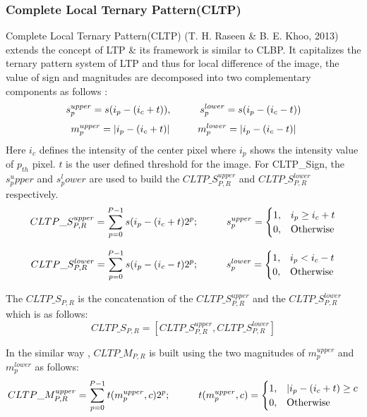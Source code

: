 \documentclass[12pt]{article}
\newcommand\tab[1][1cm]{\hspace*{#1}}
\begin{document}
\subsubsection{Complete Local Ternary Pattern(CLTP)}
Complete Local Ternary Pattern(CLTP) (T. H. Raseen \& B. E. Khoo, 2013)\cite{cltp01} extends the concept of LTP \& its framework is similar to CLBP. It capitalizes the ternary pattern system of LTP and thus for local difference of the image, the value of sign and magnitudes are decomposed into two complementary components as follows : 
$$
s_p^{upper} = s(i_p - (i_c + t)), \tab s_p^{lower} = s(i_p - (i_c - t))\\
$$
$$
m_p^{upper} = |i_p - (i_c +t)| \tab 	m_p^{lower} = |i_p - (i_c -t)|\\
$$
Here $i_c$ defines the intensity of the center pixel where $i_p$ shows the intensity value of $p_{th}$ pixel. $t$ is the user defined threshold for the image. For CLTP\_Sign, the $	s_p^upper$ and $s_p^lower$ are used to build the $CLTP\_S_{P,R}^{upper}$ and $CLTP\_S_{P,R}^{lower} $ respectively.
\begin{equation}
CLTP\_S_{P,R}^{upper} = \sum\limits_{p=0}^{P-1}{s(i_p - (i_c + t){{2}^{p}}}; \tab  	s_p^{upper}= 
\begin{cases}
1,&  i_p\geq i_c + t\\
0,&  \text{Otherwise}
\end{cases}
\end{equation}

\begin{equation}
CLTP\_S_{P,R}^{lower} = \sum\limits_{p=0}^{P-1}{s(i_p - (i_c - t){{2}^{p}}}; \tab  	s_p^{lower}= 
\begin{cases}
1,&  i_p < i_c - t\\
0,&  \text{Otherwise}
\end{cases}
\end{equation}

The $CLTP\_S_{P,R}$ is the concatenation of the $CLTP\_S_{P,R}^{upper}$ and the $CLTP\_S_{P,R}^{lower}$ which is as follows:
\begin{equation}
CLTP\_S_{P,R}= [CLTP\_S_{P,R}^{upper},CLTP\_S_{P,R}^{lower}]
\end{equation}

In the similar way , $CLTP\_M_{P,R}$ is built using the two magnitudes of $	m_p^{upper}$ and $	m_p^{lower}$ as  follows:
\begin{equation}
CLTP\_M_{P,R}^{upper} = \sum\limits_{p=0}^{P-1}{t(m_p^{upper},c){{2}^{p}}}; \tab  	t(m_p^{upper},c)= 
\begin{cases}
1,&  |i_p -(i_c + t)\geq c\\
0,&  \text{Otherwise}
\end{cases}
\end{equation}
\end{document}
